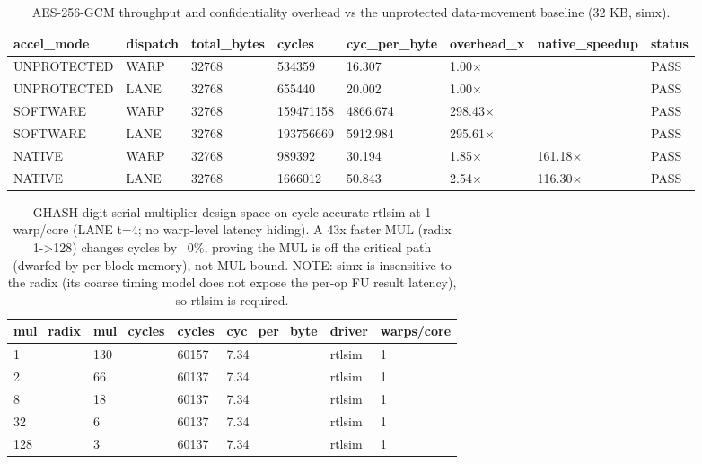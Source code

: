 \begin{table}[t]
\centering
\caption{AES-256-GCM throughput and confidentiality overhead vs the unprotected data-movement baseline (32 KB, simx).}
\label{tab:gcm_overhead}
\begin{tabular}{llllllll}
\toprule
accel\_mode & dispatch & total\_bytes & cycles & cyc\_per\_byte & overhead\_x & native\_speedup & status \\
\midrule
UNPROTECTED & WARP & 32768 & 534359 & 16.307 & 1.00$\times$ &  & PASS \\
UNPROTECTED & LANE & 32768 & 655440 & 20.002 & 1.00$\times$ &  & PASS \\
SOFTWARE & WARP & 32768 & 159471158 & 4866.674 & 298.43$\times$ &  & PASS \\
SOFTWARE & LANE & 32768 & 193756669 & 5912.984 & 295.61$\times$ &  & PASS \\
NATIVE & WARP & 32768 & 989392 & 30.194 & 1.85$\times$ & 161.18$\times$ & PASS \\
NATIVE & LANE & 32768 & 1666012 & 50.843 & 2.54$\times$ & 116.30$\times$ & PASS \\
\bottomrule
\end{tabular}
\end{table}

\begin{table}[t]
\centering
\caption{GHASH digit-serial multiplier design-space on cycle-accurate rtlsim at 1 warp/core (LANE t=4; no warp-level latency hiding). A 43x faster MUL (radix 1->128) changes cycles by ~0\%, proving the MUL is off the critical path (dwarfed by per-block memory), not MUL-bound. NOTE: simx is insensitive to the radix (its coarse timing model does not expose the per-op FU result latency), so rtlsim is required.}
\label{tab:ghash_design_space}
\begin{tabular}{llllll}
\toprule
mul\_radix & mul\_cycles & cycles & cyc\_per\_byte & driver & warps/core \\
\midrule
1 & 130 & 60157 & 7.34 & rtlsim & 1 \\
2 & 66 & 60137 & 7.34 & rtlsim & 1 \\
8 & 18 & 60137 & 7.34 & rtlsim & 1 \\
32 & 6 & 60137 & 7.34 & rtlsim & 1 \\
128 & 3 & 60137 & 7.34 & rtlsim & 1 \\
\bottomrule
\end{tabular}
\end{table}

